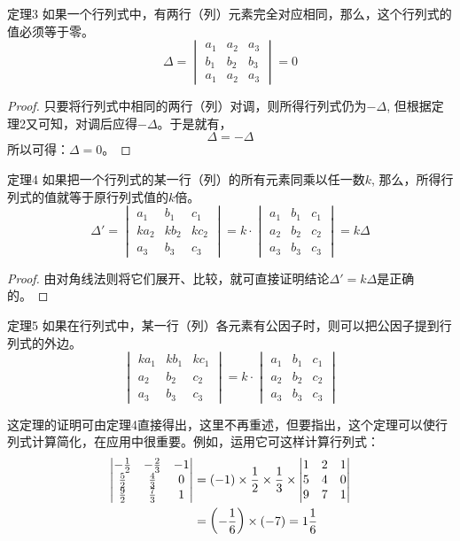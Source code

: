 \begin{blk}{定理3}
 如果一个行列式中，有两行（列）元素完全对应相同，那么，这个行列式的值必须等于零。   
 \[\Delta=\begin{vmatrix}
     a_1&a_2&a_3\\ b_1&b_2&b_3\\a_1&a_2&a_3
 \end{vmatrix}=0\]
\end{blk}

\begin{proof}
只要将行列式中相同的两行（列）对调，则所得行列式仍为$-\Delta$, 但根据定理2又可知，对调后应得$-\Delta$。于是就有，    
\[\Delta=-\Delta\]
所以可得：$\Delta=0$。
\end{proof}

\begin{blk}{定理4}
如果把一个行列式的某一行（列）的所有元素同乘以任一数$k$, 那么，所得行列式的值就等于原行列式值的$k$倍。
\[\Delta'=\begin{vmatrix}
    a_1&b_1&c_1\\ka_2&kb_2&kc_2\\a_3&b_3&c_3
\end{vmatrix}=k\cdot \begin{vmatrix}
    a_1&b_1&c_1\\a_2&b_2&c_2\\a_3&b_3&c_3
\end{vmatrix}=k\Delta\]
\end{blk}

\begin{proof}
由对角线法则将它们展开、比较，就可直接证明结论$\Delta'=k\Delta$是正确的。
\end{proof}

\begin{blk}{定理5}
    如果在行列式中，某一行（列）各元素有公因子时，则可以把公因子提到行列式的外边。
\[\begin{vmatrix}
    ka_1&kb_1&kc_1\\a_2&b_2&c_2\\a_3&b_3&c_3
\end{vmatrix}=k\cdot \begin{vmatrix}
    a_1&b_1&c_1\\a_2&b_2&c_2\\a_3&b_3&c_3
\end{vmatrix}
    \]
\end{blk}

这定理的证明可由定理4直接得出，这里不再重述，但要指出，这个定理可以使行列式计算简化，在应用中很重要。例如，运用它可这样计算行列式：
\[\begin{split}
\begin{vmatrix}
    -\tfrac{1}{2}&-\tfrac{2}{3}&-1\\
    \tfrac{5}{2}&\tfrac{4}{3}&0\\
    \tfrac{9}{2}&\tfrac{7}{3}&1
\end{vmatrix}&=(-1)\times\dfrac{1}{2}\times\dfrac{1}{3}\times\begin{vmatrix}
    1&2&1\\5&4&0\\9&7&1
\end{vmatrix}\\
&=\left(-\dfrac{1}{6}\right)\times(-7)=1\dfrac{1}{6}
\end{split}\]

